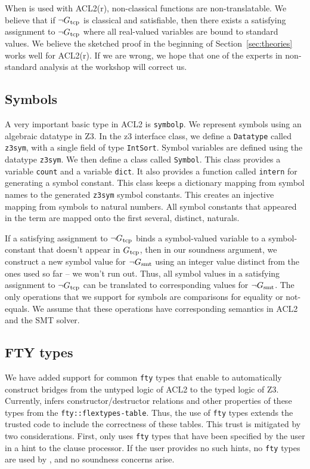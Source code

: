 When \smtlink{} is used with ACL2(r), non-classical functions are non-translatable.
We believe that if $\neg G_{\mathrm{tcp}}$ is classical and satisfiable,
then there exists a satisfying assignment to $\neg G_{\mathrm{tcp}}$ where all real-valued
variables are bound to standard values. We believe the sketched proof in the
beginning of Section~\ref{sec:theories} works well for ACL2(r). If we are wrong,
we hope that one of the experts in non-standard analysis at the workshop will
correct us.

\subsection{Symbols}
A very important basic type in ACL2 is \texttt{symbolp}. We represent symbols
using an algebraic datatype in Z3. In the z3 interface class, we define a
\texttt{Datatype} called \texttt{z3sym}, with a single field of type
\texttt{IntSort}. Symbol variables are defined using the datatype
\texttt{z3sym}. We then define a class called \texttt{Symbol}. This class
provides a variable \texttt{count} and a variable \texttt{dict}. It also
provides a function called \texttt{intern} for generating a symbol constant.
This class keeps a dictionary mapping from symbol names to the generated
\texttt{z3sym} symbol constants. This creates an injective mapping from symbols
to natural numbers. 
All symbol constants that appeared in the term are mapped onto the first
several, distinct, naturals.

If a satisfying assignment to $\neg G_{\mathrm{tcp}}$ binds a symbol-valued variable
to a symbol-constant that doesn't appear in $G_{\mathrm{tcp}}$, then in our soundness
argument, we construct a new symbol value for $\neg G_{\mathrm{smt}}$ using an integer
value distinct from the ones used so far -- we won't run out.
Thus, all symbol values in a satisfying assignment to $\neg G_{\mathrm{tcp}}$
can be translated to corresponding values for $\neg G_{\mathrm{smt}}$.
The only operations that we support for symbols are comparisons for equality or
not-equals.  We assume that these operations have corresponding semantics in
ACL2 and the SMT solver.


\subsection{FTY types}
We have added support for common \texttt{fty} types that enable \smtlink{} to
automatically construct bridges from the untyped logic of ACL2 to the typed logic of Z3.
Currently, \smtlink{} infers constructor/destructor relations and other properties
of these types from the \texttt{fty::flextypes-table}.
Thus, the use of \texttt{fty} types extends
the trusted code to include the correctness of these tables.  This trust is mitigated
by two considerations.  First, \smtlink{} only uses \texttt{fty} types that have been
specified by the user in a hint to the \smtlink{} clause processor.  If the user
provides no such hints, no \texttt{fty} types are used by \smtlink{}, and no
soundness concerns arise.

